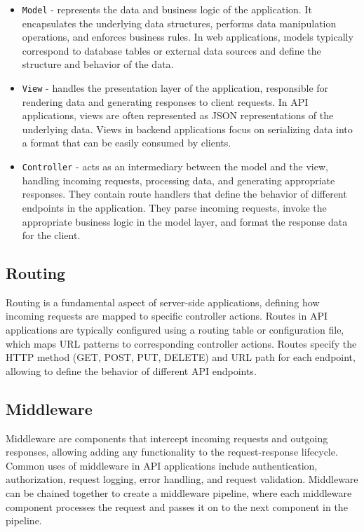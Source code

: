 \documentclass[
  biblatex = false,
  language=english,
  figures=false,
  sourcecodes,
  glossaries,
  index
]{kidiplom}
\begin{document}
\begin{itemize}
	\item \texttt{Model}  - represents the data and business logic of the application. It encapsulates the underlying data structures, performs data manipulation operations, and enforces business rules. In web applications, models typically correspond to database tables or external data sources and define the structure and behavior of the data.
	\item \texttt{View} - handles the presentation layer of the application, responsible for rendering data and generating responses to client requests. In API applications, views are often represented as JSON representations of the underlying data. Views in backend applications focus on serializing data into a format that can be easily consumed by clients.
	\item \texttt{Controller} - acts as an intermediary between the model and the view, handling incoming requests, processing data, and generating appropriate responses. They contain route handlers that define the behavior of different endpoints in the application. They parse incoming requests, invoke the appropriate business logic in the model layer, and format the response data for the client.
\end{itemize}

\subsection{Routing}
Routing is a fundamental aspect of server-side applications, defining how incoming requests are mapped to specific controller actions. Routes in API applications are typically configured using a routing table or configuration file, which maps URL patterns to corresponding controller actions. Routes specify the HTTP method (GET, POST, PUT, DELETE) and URL path for each endpoint, allowing to define the behavior of different API endpoints.

\subsection{Middleware}
Middleware are components that intercept incoming requests and outgoing responses, allowing adding any functionality to the request-response lifecycle. Common uses of middleware in API applications include authentication, authorization, request logging, error handling, and request validation. Middleware can be chained together to create a middleware pipeline, where each middleware component processes the request and passes it on to the next component in the pipeline.
\end{document}
